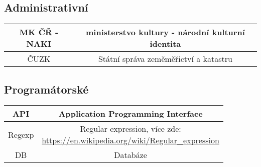 \documentclass[12pt,a4paper]{report}
\begin{document}



\tableofcontents














\listoffigures



\subsection*{Administrativní}
\begin{tabular}{| c | c |}
	\hline
		MK ČŘ - NAKI & ministerstvo kultury - národní kulturní identita \\
	\hline
		ČUZK & Státní správa zeměměřictví a katastru \\
	\hline
\end{tabular}

\subsection*{Programátorské}
\begin{tabular}{| c | c |}
	\hline
		API & Application Programming Interface \\
	\hline
		Regexp & \makecell{Regular expression, více zde: \\ \url{https://en.wikipedia.org/wiki/Regular_expression}} \\
	\hline
		DB & Databáze \\
	\hline
\end{tabular}
\end{document}
